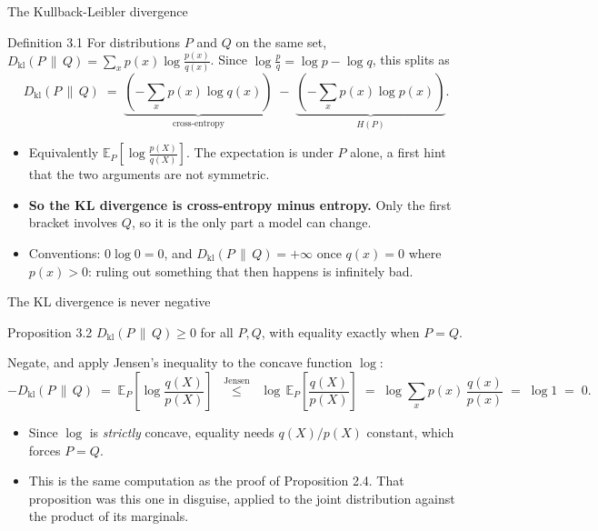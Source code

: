 \documentclass[aspectratio=169,9pt]{beamer}
\newcommand{\orange}[1]{\textcolor{AmazonOrange}{\textbf{#1}}}
\newcommand{\muted}[1]{\textcolor{EPICMuted}{#1}}
\newcommand{\KL}[2]{D_{\mathrm{kl}}\!\left(#1 \,\|\, #2\right)}
\newcommand{\E}{\mathbb{E}}
\begin{document}
\begin{frame}{The Kullback-Leibler divergence}
\begin{block}{Definition 3.1}
For distributions $P$ and $Q$ on the same set, $\KL{P}{Q} = \sum_x p(x)\log\frac{p(x)}{q(x)}$.
Since $\log\frac{p}{q} = \log p - \log q$, this splits as
\vspace{-0.15cm}
\[
    \KL{P}{Q} \;=\; \underbrace{\left(-\sum_x p(x) \log q(x)\right)}_{\textstyle \text{cross-entropy}}
      \;-\; \underbrace{\left(-\sum_x p(x) \log p(x)\right)}_{\textstyle H(P)} .
\]
\end{block}
\pause
\vspace{0.05cm}
\begin{itemize}
    \item Equivalently $\E_P\!\left[\log \frac{p(X)}{q(X)}\right]$. The expectation is under $P$ alone, a
    first hint that the two arguments are not symmetric.
    \pause
    \item \orange{So the KL divergence is cross-entropy minus entropy.} Only the first bracket involves $Q$,
    so it is the only part a model can change.
    \pause
    \item Conventions: $0\log 0 = 0$, and $\KL{P}{Q} = +\infty$ once $q(x) = 0$ where $p(x) > 0$: ruling out
    something that then happens is infinitely bad.
\end{itemize}
\end{frame}

\begin{frame}{The KL divergence is never negative}
\begin{block}{Proposition 3.2}
$\KL{P}{Q} \ge 0$ for all $P, Q$, with equality exactly when $P = Q$.
\end{block}
\pause
\vspace{0.1cm}
Negate, and apply Jensen's inequality to the concave function $\log$:
\vspace{-0.1cm}
\[
    -\KL{P}{Q} \;=\; \E_P\!\left[\log \frac{q(X)}{p(X)}\right]
    \;\;\overset{\text{Jensen}}{\le}\;\;
    \log\, \E_P\!\left[\frac{q(X)}{p(X)}\right]
    \;=\; \log \sum_x p(x)\,\frac{q(x)}{p(x)}
    \;=\; \log 1 \;=\; 0 .
\]
\pause
\vspace{-0.1cm}
\begin{itemize}
    \item Since $\log$ is \textit{strictly} concave, equality needs $q(X)/p(X)$ constant, which forces $P = Q$.
    \pause
    \item \muted{This is the same computation as the proof of Proposition 2.4. That proposition was this one
    in disguise, applied to the joint distribution against the product of its marginals.}
\end{itemize}
\end{frame}
\end{document}
